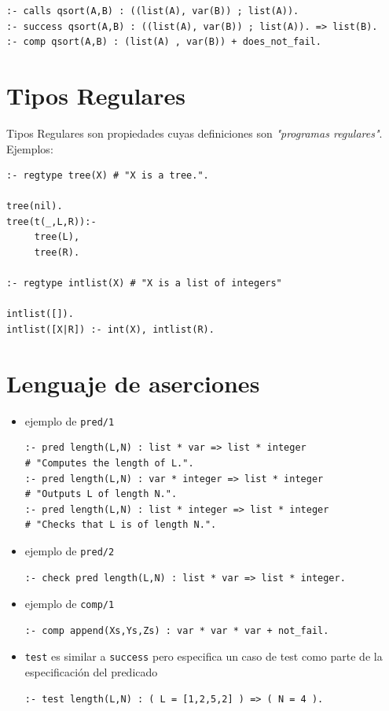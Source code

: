 \documentclass[11pt]{article}
\begin{document}
\begin{verbatim}
:- calls qsort(A,B) : ((list(A), var(B)) ; list(A)).
:- success qsort(A,B) : ((list(A), var(B)) ; list(A)). => list(B).
:- comp qsort(A,B) : (list(A) , var(B)) + does_not_fail.
\end{verbatim}

\section*{Tipos Regulares}
\label{sec:org1f0485f}

Tipos Regulares son propiedades cuyas definiciones son  \emph{"programas
regulares"}. Ejemplos:

\begin{verbatim}
:- regtype tree(X) # "X is a tree.".

tree(nil).
tree(t(_,L,R)):- 
     tree(L),
     tree(R).

:- regtype intlist(X) # "X is a list of integers"

intlist([]).
intlist([X|R]) :- int(X), intlist(R).
\end{verbatim}

\section*{Lenguaje de aserciones}
\label{sec:org46babe0}
\begin{itemize}
\item ejemplo de \texttt{pred/1} 
\begin{verbatim}
:- pred length(L,N) : list * var => list * integer 
# "Computes the length of L.".
:- pred length(L,N) : var * integer => list * integer  
# "Outputs L of length N.".
:- pred length(L,N) : list * integer => list * integer
# "Checks that L is of length N.".
\end{verbatim}
\item ejemplo de \texttt{pred/2}
\begin{verbatim}
:- check pred length(L,N) : list * var => list * integer.
\end{verbatim}

\item ejemplo de \texttt{comp/1}
\begin{verbatim}
:- comp append(Xs,Ys,Zs) : var * var * var + not_fail.
\end{verbatim}

\item \texttt{test} es similar a \texttt{success} pero especifica un caso de test como
parte de la especificación del predicado
\begin{verbatim}
:- test length(L,N) : ( L = [1,2,5,2] ) => ( N = 4 ).
\end{verbatim}
\end{itemize}
\end{document}
